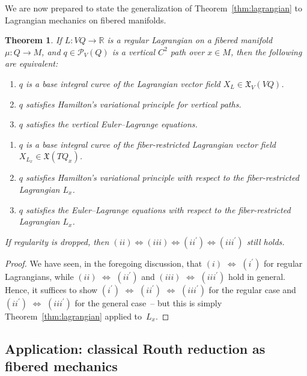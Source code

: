 \documentclass[10pt,a4paper]{amsart}
\numberwithin{equation}{section}
\newtheorem{Theorem}{Theorem}[section]
\begin{document}
We are now prepared to state the generalization of Theorem~\ref{thm:lagrangian} to Lagrangian mechanics on f\/ibered manifolds.

\begin{Theorem} \label{thm:fiberedLagrangian}
If $ L \colon V Q \rightarrow \mathbb{R} $ is a regular Lagrangian on a fibered manifold $ \mu \colon Q \rightarrow M $, and $ q \in \mathcal{P} _V (Q) $ is a vertical $ C ^2 $ path over $ x \in M $, then the following are equivalent:
\begin{enumerate}[label={\rm (}\roman*{\rm )}]\itemsep=0pt
\item $q$ is a base integral curve of the Lagrangian vector field $ X _L \in \mathfrak{X} _V ( V Q ) $.
\item $q$ satisfies Hamilton's variational principle for vertical paths.
\item $q$ satisfies the vertical Euler--Lagrange equations.
\end{enumerate}
\begin{enumerate}[label={\rm (}\roman*$\,{}^\prime${\rm )}]\itemsep=0pt
\item $q$ is a base integral curve of the fiber-restricted Lagrangian vector field $ X _{ L _x } \in \mathfrak{X} ( T Q _x ) $.
\item $q$ satisfies Hamilton's variational principle with respect to the fiber-restricted Lagrangian $ L _x $.
\item $q$ satisfies the Euler--Lagrange equations with respect to the fiber-restricted Lagrangian $ L _x $.
\end{enumerate}
If regularity is dropped, then $ ( ii ) \Leftrightarrow ( iii ) \Leftrightarrow ( ii ^\prime )\Leftrightarrow ( iii ^\prime ) $ still holds.
\end{Theorem}

\begin{proof}
We have seen, in the foregoing discussion, that $(i)$ $ \Leftrightarrow $ $(i ^\prime)$ for regular Lagrangians, while $(ii)$ $ \Leftrightarrow $ $(ii ^\prime)$ and $(iii)$ $ \Leftrightarrow $ $(iii ^\prime)$ hold in general. Hence, it suf\/f\/ices to show $(i ^\prime)$ $ \Leftrightarrow $ $(ii ^\prime)$ $ \Leftrightarrow $ $(iii ^\prime)$ for the regular case and $(ii ^\prime)$ $ \Leftrightarrow $ $(iii ^\prime)$ for the general case~-- but this is simply Theorem~\ref{thm:lagrangian} applied to~$L _x$.
\end{proof}

\subsection{Application: classical Routh reduction as f\/ibered mechanics}
\end{document}
